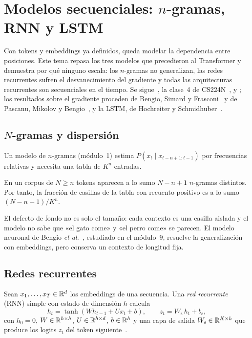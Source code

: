 \chapter{Modelos secuenciales: \texorpdfstring{$n$}{n}-gramas, RNN y LSTM}
\label{tema:5}

Con tokens y embeddings ya definidos, queda modelar la dependencia entre posiciones. Este tema repasa los tres modelos que precedieron al Transformer y demuestra por qué ninguno escala: los $n$-gramas no generalizan, las redes recurrentes sufren el desvanecimiento del gradiente y todas las arquitecturas recurrentes son secuenciales en el tiempo. Se sigue~\cite[cap.~14]{jm3}, la clase~4 de CS224N~\cite{cs224n}, \cite[cap.~10]{gbc} y \cite[§9.7 y §10.1]{d2l}; los resultados sobre el gradiente proceden de Bengio, Simard y Frasconi~\cite{bengio94} y de Pascanu, Mikolov y Bengio~\cite[§2--3]{pascanu}, y la LSTM, de Hochreiter y Schmidhuber~\cite{lstm}.

\section{\texorpdfstring{$N$}{N}-gramas y dispersión}

Un modelo de $n$-gramas (módulo~1) estima $P(x_t\mid x_{t-n+1:t-1})$ por frecuencias relativas y necesita una tabla de $K^{n}$ entradas.

\begin{proposicion}\label{prop:dispersion}
En un corpus de $N\ge n$ tokens aparecen a lo sumo $N-n+1$ $n$-gramas distintos. Por tanto, la fracción de casillas de la tabla con recuento positivo es a lo sumo $(N-n+1)/K^{n}$.
\end{proposicion}

\addtocounter{definicion}{1}%

El defecto de fondo no es solo el tamaño: cada contexto es una casilla aislada y el modelo no sabe que «el gato come» y «el perro come» se parecen. El modelo neuronal de Bengio \emph{et al.}~\cite{bengio03}, estudiado en el módulo~9, resuelve la generalización con embeddings, pero conserva un contexto de longitud fija.

\section{Redes recurrentes}

\begin{definicion}\label{def:rnn}
Sean $x_1,\dots,x_T\in\mathbb{R}^{d}$ los embeddings de una secuencia. Una \emph{red recurrente} (RNN) simple con estado de dimensión $h$ calcula
\[
h_t=\tanh(W h_{t-1}+U x_t+b),\qquad z_t=W_{\mathrm{s}}\,h_t+b_{\mathrm{s}},
\]
con $h_0=0$, $W\in\mathbb{R}^{h\times h}$, $U\in\mathbb{R}^{h\times d}$, $b\in\mathbb{R}^{h}$ y una capa de salida $W_{\mathrm{s}}\in\mathbb{R}^{K\times h}$ que produce los logits $z_t$ del token siguiente~\cite[§14.1--14.2]{jm3}.
\end{definicion}

